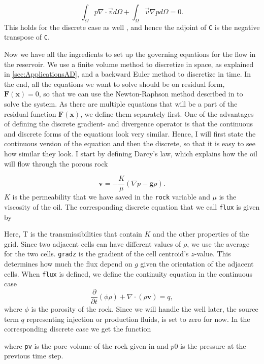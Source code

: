 \begin{equation*}
    \int_\Omega p\nabla \cdot \vec{v} d\Omega + \int_\Omega \vec{v}\nabla p d\Omega = 0.
\end{equation*}
This holds for the discrete case as well \emph{\citep{lieMrstUrl}}, and hence the adjoint of \texttt{C} is the negative transpose of \texttt{C}.


Now we have all the ingredients to set up the governing equations for the flow in the reservoir. We use a finite volume method to discretize in space, as explained in \autoref{sec:ApplicationsAD}, and a backward Euler method to discretize in time. In the end, all the equations we want to solve should be on residual form, $\boldsymbol{F}(\boldsymbol{x}) = 0$, so that we can use the Newton-Raphson method described in  to solve the system. As there are multiple equations that will be a part of the residual function $\boldsymbol{F}(\boldsymbol{x})$, we define them separately first. One of the advantages of defining the discrete gradient- and divergence operator is that the continuous and discrete forms of the equations look very similar. Hence, I will first state the continuous version of the equation and then the discrete, so that it is easy to see how similar they look. I start by defining Darcy's law, which explains how the oil will flow through the porous rock

\begin{equation}
    \textbf{v} = - \frac{K}{\mu}(\nabla p - \textbf{g}\rho).
    \label{eq:pressSolverDarcy}
\end{equation}
$K$ is the permeability that we have saved in the \texttt{rock} variable and $\mu$ is the viscosity of the oil.
The corresponding discrete equation that we call \texttt{flux} is given by 

Here, T is the transmissibilities that contain $K$ and the other properties of the grid. Since two adjacent cells can have different values of $\rho$, we use the  average for the two cells. \texttt{gradz} is the gradient of the cell centroid's $z$-value. This determines how much the flux depend on $g$ given the orientation of the adjacent cells. When \texttt{flux} is defined, we define the continuity equation in the continuous case
\begin{equation}
    \frac{\partial}{\partial t}(\phi\rho) + \nabla\cdot(\rho\textbf{v}) = q,
    \label{eq:continuityEqPressure}
\end{equation}
where $\phi$ is the porosity of the rock. Since we will handle the well later, the source term $q$ representing injection or production fluids, is set to zero for now. In the corresponding discrete case we get the function

where \texttt{pv} is the pore volume of the rock given in  and $p0$ is the pressure at the previous time step. 

